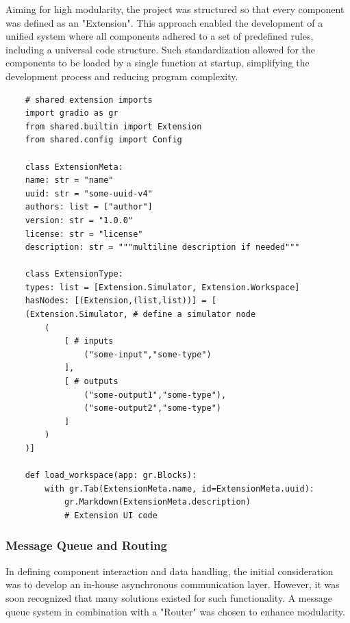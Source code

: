 \documentclass[11pt, a4paper, titlepage]{article}
\begin{document}
Aiming for high modularity, the project was structured so that every component was defined as an "Extension". This approach enabled the development of a unified system where all components adhered to a set of predefined rules, including a universal code structure. Such standardization allowed for the components to be loaded by a single function at startup, simplifying the development process and reducing program complexity.

\begin{verbatim}
	# shared extension imports
	import gradio as gr
	from shared.builtin import Extension
	from shared.config import Config
	
	class ExtensionMeta:
	name: str = "name"
	uuid: str = "some-uuid-v4"
	authors: list = ["author"]
	version: str = "1.0.0"
	license: str = "license"
	description: str = """multiline description if needed"""

	class ExtensionType:
	types: list = [Extension.Simulator, Extension.Workspace]
	hasNodes: [(Extension,(list,list))] = [
	(Extension.Simulator, # define a simulator node
		(
			[ # inputs
				("some-input","some-type")
			],
			[ # outputs
				("some-output1","some-type"), 
				("some-output2","some-type")
			]
		)
	)]
	
	def load_workspace(app: gr.Blocks):
		with gr.Tab(ExtensionMeta.name, id=ExtensionMeta.uuid):
			gr.Markdown(ExtensionMeta.description)
			# Extension UI code

\end{verbatim}
\newpage

\subsubsection{Message Queue and Routing}

In defining component interaction and data handling, the initial consideration was to develop an in-house asynchronous communication layer. However, it was soon recognized that many solutions existed for such functionality. A message queue system in combination with a "Router" was chosen to enhance modularity.
\end{document}
